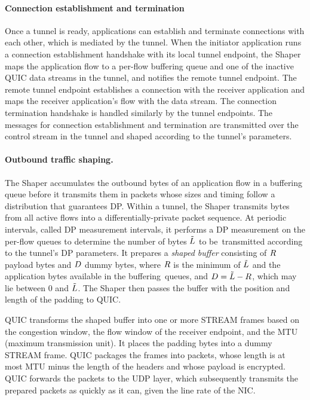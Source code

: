 \paragraph{Connection establishment and termination}
Once a tunnel is ready, applications can establish and terminate connections with each other, which is mediated by the tunnel.
When the initiator application runs a connection establishment handshake with its local tunnel endpoint, the Shaper maps the application flow to a per-flow buffering queue and one of the inactive QUIC data streams in the tunnel, and notifies the remote tunnel endpoint.
The remote tunnel endpoint establishes a connection with the receiver application and maps the receiver application's flow with the data stream.
The connection termination handshake is handled similarly by the tunnel endpoints.
The messages for connection establishment and termination are transmitted over the control stream in the tunnel and shaped according to the tunnel's parameters.

\paragraph{Outbound traffic shaping.}
The Shaper accumulates the outbound bytes of an application flow in a buffering queue before it transmits them in packets whose sizes and timing follow a distribution that guarantees DP.
Within a tunnel, the Shaper transmits bytes from all active flows into a differentially-private packet sequence.
At periodic intervals, called DP measurement intervals, it performs a DP measurement on the per-flow queues to determine the number of bytes $\tilde{L}$ to be~transmitted according to the tunnel's DP parameters.
It prepares a {\em shaped buffer} consisting of $R$ payload bytes and $D$ dummy bytes, where $R$ is the minimum of $\tilde{L}$ and the application bytes available in the buffering~queues, and $D = \tilde{L} - R$, which may lie between 0 and $\tilde{L}$.
The Shaper then passes the buffer with the position and length of the padding to QUIC.

QUIC transforms the shaped buffer into one or more STREAM frames based on the
congestion window, the flow window of the receiver endpoint, and the MTU
(maximum transmission unit).
It places the padding bytes into a dummy STREAM frame.
QUIC packages the frames into packets, whose length is at most MTU minus the length of the headers and whose payload is encrypted.
QUIC forwards the packets to the UDP layer, which subsequently transmits the prepared packets as quickly as it can, given the line rate of the NIC.

